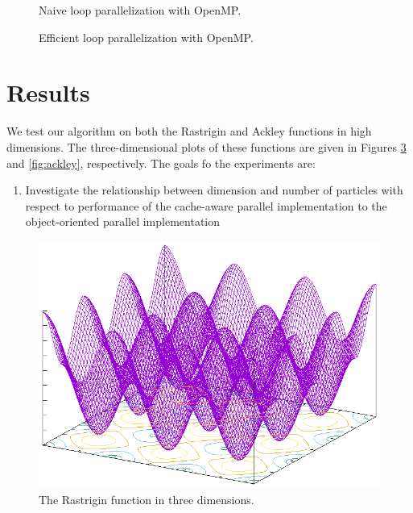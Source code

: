 \begin{figure}
  
  \caption{Naive loop parallelization with OpenMP.}\label{fig:naive-par}
\end{figure}

\begin{figure}
  
  \caption{Efficient loop parallelization with OpenMP.}\label{fig:efficient-par}
\end{figure}

\section{Results}\label{sec:results}
We test our algorithm on both the Rastrigin \cite{rastrigin} and Ackley \cite{ackley} functions
in high dimensions. The three-dimensional plots of these functions are given in Figures
\ref{fig:rastrigin} and \ref{fig:ackley}, respectively.  The goals fo the
experiments are:
\begin{enumerate}
  \item Investigate the relationship between dimension and number of particles
    with respect to performance of the cache-aware parallel implementation to
    the object-oriented parallel implementation
\end{enumerate}

\begin{figure}
  \includegraphics[width=\columnwidth]{../img/output/rastrigin}
  \caption{The Rastrigin function in three dimensions.}\label{fig:rastrigin}
\end{figure}

